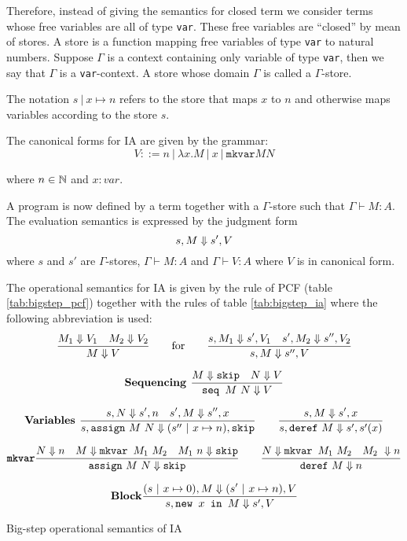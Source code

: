 Therefore, instead of giving the semantics for closed term we consider terms
whose free variables are all of type \texttt{var}. These free variables are ``closed'' by mean of
stores. A store is a function mapping free variables of type \texttt{var} to natural numbers.
Suppose $\Gamma$ is a context containing only variable of type \texttt{var}, then we say that
$\Gamma$ is a \texttt{var}-context. A store whose domain $\Gamma$ is called a $\Gamma$-store.

The notation $s\ |\ x \mapsto n$ refers to the store that maps $x$ to $n$
and otherwise maps variables according to the store $s$.


The canonical forms for IA are given by the grammar:
$$ V ::= n\ |\ \lambda x. M\ |\ x\ |\  \texttt{mkvar} M N$$

where $n \in \mathbb{N}$ and $x:var$.


A program is now defined by a term together with a $\Gamma$-store such that $\Gamma \vdash M : A$.
The evaluation semantics is expressed by the judgment form
$$s,M \Downarrow s', V$$
where $s$ and $s'$ are $\Gamma$-stores,
$\Gamma \vdash M : A$ and $\Gamma \vdash V : A$ where $V$ is in canonical form.

The operational semantics for IA is given by the rule of PCF (table \ref{tab:bigstep_pcf})
together with the rules of table \ref{tab:bigstep_ia} where the following abbreviation is used:
$$ \frac{\displaystyle M_1 \Downarrow V_1 \quad M_2 \Downarrow V_2}{M \Downarrow V} \qquad \mbox{for} \qquad
  \frac{\displaystyle s,M_1 \Downarrow s',V_1 \quad s', M_2 \Downarrow s'',V_2 }{s,M \Downarrow s'',V}
$$


\begin{table}[htbp]
$$\mbox{\textbf{Sequencing }}
    \frac{\displaystyle M \Downarrow \texttt{skip} \quad N \Downarrow V}{\texttt{seq } M\ N \Downarrow V}
$$

$$\mbox{\textbf{Variables }}
    \frac{\displaystyle s,N \Downarrow s',n \quad s',M \Downarrow s'',x}{s, \texttt{assign}\ M\ N \Downarrow (s''\ |\ x \mapsto n),\texttt{skip}}
\qquad
    \frac{\displaystyle s,M \Downarrow s',x }{s, \texttt{deref}\ M \Downarrow s',s'(x)}$$

$$\mbox{\texttt{\textbf{mkvar}}}
    \frac{\displaystyle N \Downarrow n \quad M \Downarrow \texttt{mkvar } M_1\ M_2 \quad M_1\ n \Downarrow \texttt{skip}}{\texttt{assign}\ M\ N \Downarrow \texttt{skip}}
\qquad
    \frac{\displaystyle N \Downarrow \texttt{mkvar } M_1\ M_2 \quad M_2\ \Downarrow n}{\texttt{deref}\ M \Downarrow n}
$$

$$\mbox{\textbf{Block}}
    \frac{\displaystyle (s\ |\ x \mapsto 0),M \Downarrow (s'\ |\ x \mapsto n),V }{s, \texttt{new } x \texttt{ in } M \Downarrow s',V}
$$

\label{tab:bigstep_ia}
\caption{Big-step operational semantics of IA}
\end{table}

